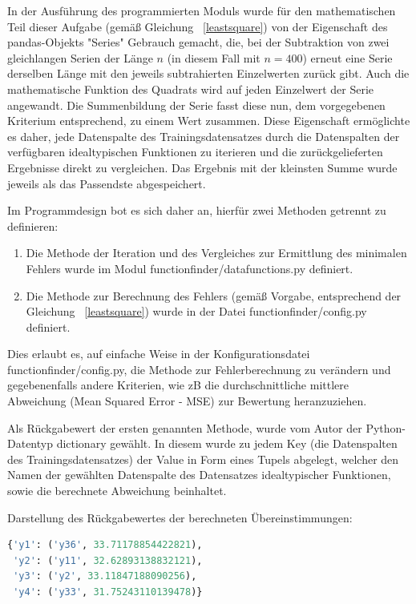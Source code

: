 In der Ausführung des programmierten Moduls wurde für den mathematischen Teil dieser Aufgabe (gemäß Gleichung ~\ref{leastsquare})  von der Eigenschaft des pandas-Objekts "Series" Gebrauch gemacht, die, bei der Subtraktion von zwei gleichlangen Serien der Länge $n$ (in diesem Fall mit $n=400$) erneut eine Serie derselben Länge mit den jeweils subtrahierten Einzelwerten zurück gibt. Auch die mathematische Funktion des Quadrats wird auf jeden Einzelwert der Serie angewandt. Die Summenbildung der Serie fasst diese nun, dem vorgegebenen Kriterium entsprechend, zu einem Wert zusammen.
Diese Eigenschaft ermöglichte es daher, jede Datenspalte des Trainingsdatensatzes durch die Datenspalten der verfügbaren idealtypischen Funktionen zu iterieren und die zurückgelieferten Ergebnisse direkt zu vergleichen. Das Ergebnis mit der kleinsten Summe wurde jeweils als das Passendste abgespeichert.

Im Programmdesign bot es sich daher an, hierfür zwei Methoden getrennt zu definieren:
\begin{enumerate}
 \itemsep0pt
 \item Die Methode der Iteration und des Vergleiches zur Ermittlung des minimalen Fehlers wurde im Modul functionfinder/datafunctions.py definiert.
 \item Die Methode zur Berechnung des Fehlers (gemäß Vorgabe, entsprechend der Gleichung ~\ref{leastsquare}) wurde in der Datei functionfinder/config.py definiert.
\end{enumerate}

Dies erlaubt es, auf einfache Weise in der Konfigurationsdatei functionfinder/config.py, die Methode zur Fehlerberechnung zu verändern und gegebenenfalls andere Kriterien, wie zB die durchschnittliche mittlere Abweichung (Mean Squared Error - MSE) zur Bewertung heranzuziehen. 

Als Rückgabewert der ersten genannten Methode, wurde vom Autor der Python-Datentyp dictionary gewählt. In diesem wurde zu jedem Key (die Datenspalten des Trainingsdatensatzes) der Value in Form eines Tupels abgelegt, welcher den Namen der gewählten Datenspalte des Datensatzes idealtypischer Funktionen, sowie die berechnete Abweichung beinhaltet.

Darstellung des Rückgabewertes der berechneten Übereinstimmungen:
\begin{lstlisting}[language=python]
{'y1': ('y36', 33.71178854422821),
 'y2': ('y11', 32.62893138832121),
 'y3': ('y2', 33.11847188090256),
 'y4': ('y33', 31.75243110139478)}
\end{lstlisting}

